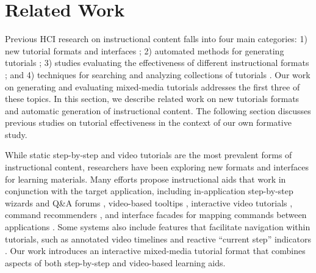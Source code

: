 \section{Related Work}
\label{mixt_related}

Previous HCI research on instructional content falls into four main categories:
%
1) new tutorial formats and interfaces \cite{Bergman:2005:DocWizards,Fernquist:2011:SRE:2047196.2047245,Grossman:2010wr,Kelleher:2005:STD:1054972.1055047,Matejka:2009:CCR:1622176.1622214,Matejka:2011:IIQ:2047196.2047218,Pongnumkul:2011ju};
%
2) automated methods for generating tutorials \cite{Denning:2011fy,Grabler:2009jj,Grossman:2010jz,Pongnumkul:2011ju};
%
3) studies evaluating the effectiveness of different instructional formats \cite{Grabler:2009jj,Grossman:2010wr,Harrison:1995uh,Palmiter:1991:ADV:107792.107797,Palmiter:1993:ADL:1461829.1461830};
%
and 4) techniques for searching and analyzing collections of tutorials \cite{Ekstrand:2011:SSL:2047196.2047220,Kong:2012:DTR:2207676.2208549}. Our work on generating and evaluating mixed-media tutorials addresses the first three of these topics. In this section, we describe related work on new tutorials formats and automatic generation of instructional content. The following section discusses previous studies on tutorial effectiveness in the context of our own formative study.

 While static step-by-step and video tutorials are the most prevalent forms of instructional content, researchers have been exploring new formats and interfaces for learning materials. Many efforts propose instructional aids that work in conjunction with the target application, including in-application step-by-step wizards \cite{Bergman:2005:DocWizards,Kelleher:2005:STD:1054972.1055047,Fernquist:2011:SRE:2047196.2047245} and Q\&A forums \cite{Matejka:2011:IIQ:2047196.2047218}, video-based tooltips \cite{Grossman:2010wr}, interactive video tutorials \cite{Pongnumkul:2011ju}, command recommenders \cite{Matejka:2009:CCR:1622176.1622214}, and interface facades for mapping commands between applications \cite{Ramesh:2011:STU:2047196.2047212}. Some systems also include features that facilitate navigation within tutorials, such as annotated video timelines \cite{Grossman:2010jz,Pongnumkul:2011ju} and reactive ``current step'' indicators \cite{Fernquist:2011:SRE:2047196.2047245}. Our work introduces an interactive mixed-media tutorial format that combines aspects of both step-by-step and video-based learning aids.

